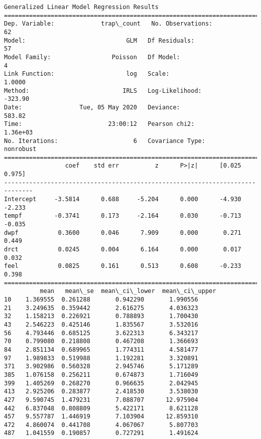 \documentclass[11pt]{article}
\begin{document}
    \begin{Verbatim}[commandchars=\\\{\}]
                 Generalized Linear Model Regression Results                  
==============================================================================
Dep. Variable:             trap\_count   No. Observations:                   62
Model:                            GLM   Df Residuals:                       57
Model Family:                 Poisson   Df Model:                            4
Link Function:                    log   Scale:                          1.0000
Method:                          IRLS   Log-Likelihood:                -323.90
Date:                Tue, 05 May 2020   Deviance:                       583.82
Time:                        23:00:12   Pearson chi2:                 1.36e+03
No. Iterations:                     6   Covariance Type:             nonrobust
==============================================================================
                 coef    std err          z      P>|z|      [0.025      0.975]
------------------------------------------------------------------------------
Intercept     -3.5814      0.688     -5.204      0.000      -4.930      -2.233
tempf         -0.3741      0.173     -2.164      0.030      -0.713      -0.035
dwpf           0.3600      0.046      7.909      0.000       0.271       0.449
drct           0.0245      0.004      6.164      0.000       0.017       0.032
feel           0.0825      0.161      0.513      0.608      -0.233       0.398
==============================================================================
          mean   mean\_se  mean\_ci\_lower  mean\_ci\_upper
10    1.369555  0.261288       0.942290       1.990556
21    3.249635  0.359442       2.616275       4.036323
32    1.158213  0.226921       0.788893       1.700430
43    2.546223  0.425146       1.835567       3.532016
56    4.793446  0.685125       3.622313       6.343217
70    0.799080  0.218808       0.467208       1.366693
84    2.851134  0.689965       1.774311       4.581477
97    1.989833  0.519988       1.192281       3.320891
371   3.902986  0.560328       2.945746       5.171289
385   1.076158  0.256211       0.674873       1.716049
399   1.405269  0.268270       0.966635       2.042945
413   2.925206  0.283877       2.418530       3.538030
427   9.590745  1.479231       7.088707      12.975904
442   6.837048  0.808809       5.422171       8.621128
457   9.557787  1.446919       7.103904      12.859310
472   4.860074  0.441708       4.067067       5.807703
487   1.041559  0.190857       0.727291       1.491624

\end{Verbatim}
\end{document}
